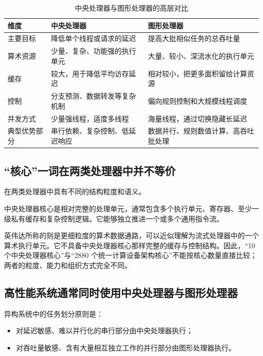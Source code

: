 \begin{table}[H]
\centering
\caption{中央处理器与图形处理器的高层对比}
\begin{tabularx}{\textwidth}{L{0.22\textwidth}Y Y}
\toprule
\textbf{维度} & \textbf{中央处理器} & \textbf{图形处理器} \\
\midrule
主要目标 & 降低单个线程或请求的延迟 & 提高大批相似任务的总吞吐量 \\
算术资源 & 少量、复杂、功能强的执行单元 & 大量、较小、深流水化的执行单元 \\
缓存 & 较大，用于降低平均访存延迟 & 相对较小，把更多面积留给计算资源 \\
控制 & 分支预测、数据转发等复杂机制 & 偏向规则控制和大规模线程调度 \\
并发方式 & 少量强线程，适度多线程 & 海量线程，通过切换隐藏长延迟 \\
典型优势部分 & 串行依赖、复杂控制、低延迟响应 & 数据并行、规则数值计算、高吞吐批处理 \\
\bottomrule
\end{tabularx}
\end{table}

\subsection{“核心”一词在两类处理器中并不等价}

在两类处理器中具有不同的结构粒度和语义。

中央处理器核心是相对完整的处理单元，通常包含多个执行单元、寄存器、至少一级私有缓存和复杂控制逻辑。它能够独立推进一个或多个通用指令流。

英伟达所称的则是更细粒度的算术数据通路，可以近似理解为流式处理器中的一个算术执行单元。它不具备中央处理器核心那样完整的缓存与控制结构。因此，“10 个中央处理器核心”与“2880 个统一计算设备架构核心”不能按核心数量直接比较；两者的粒度、能力和组织方式完全不同。

\subsection{高性能系统通常同时使用中央处理器与图形处理器}

异构系统中的任务划分原则是：
\begin{itemize}
  \item 对延迟敏感、难以并行化的串行部分由中央处理器执行；
  \item 对吞吐量敏感、含有大量相互独立工作的并行部分由图形处理器执行。
\end{itemize}

